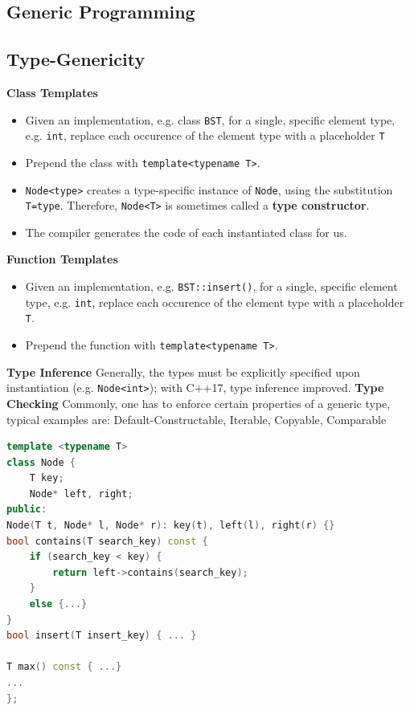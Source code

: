 \vspace{-4pt}
\begin{sectionbox}
\section{Generic Programming}
\subsection{Type-Genericity}
\textbf{Class Templates}\smallskip
\begin{itemize}
    \item Given an implementation, e.g. class \lstinline{BST}, for a single, specific element type, e.g. \lstinline{int}, replace each occurence of the element type with a placeholder \lstinline{T}
    \item Prepend the class with \lstinline{template<typename T>}.
    \item \lstinline{Node<type>} creates a type-specific instance of \lstinline{Node}, using the substitution \lstinline{T=type}. Therefore, \lstinline{Node<T>} is sometimes called a \textbf{type constructor}.
    \item The compiler generates the code of each instantiated class for us.
\end{itemize}
\textbf{Function Templates}\smallskip
\begin{itemize}
    \item Given an implementation, e.g. \lstinline{BST::insert()}, for a single, specific element type, e.g. \lstinline{int}, replace each occurence of the element type with a placeholder \lstinline{T}.
    \item Prepend the function with \lstinline{template<typename T>}.
\end{itemize}
\textbf{Type Inference}\smallskip
Generally, the types must be explicitly specified upon instantiation (e.g. \lstinline{Node<int>}); with C++17, type inference improved.
\textbf{Type Checking}\smallskip
Commonly, one has to enforce certain properties of a generic type, typical examples are: 
Default-Constructable, Iterable, Copyable, Comparable
\end{sectionbox}
\vspace{-4pt}
\begin{lstlisting}[language=C++]
template <typename T>
class Node { 
    T key;
    Node* left, right;
public:
Node(T t, Node* l, Node* r): key(t), left(l), right(r) {}
bool contains(T search_key) const {
    if (search_key < key) {
        return left->contains(search_key); 
    }
    else {...}
}
bool insert(T insert_key) { ... }

T max() const { ...}
...
};  
\end{lstlisting}
